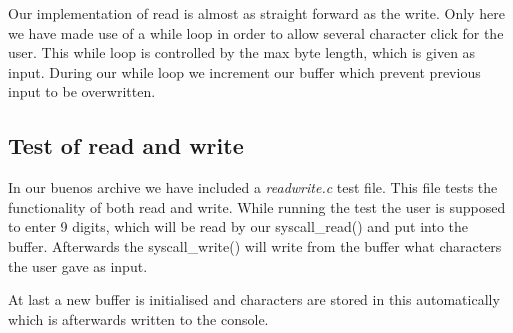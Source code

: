 \documentclass[12pt,a4paper,danish]{article}
\begin{document}
Our implementation of read is almost as straight forward as the write. Only here we have made use of a while loop in order to allow several character click for the user. This while loop is controlled by the max byte length, which is given as input.
During our while loop we increment our buffer which prevent previous input to be overwritten.

\subsection{Test of read and write}
In our buenos archive we have included a \textit{readwrite.c} test file. This file tests the functionality of both read and write.  While running the test the user is supposed to enter 9 digits, which will be read by our syscall\_read() and put into the buffer. Afterwards the syscall\_write() will write from the buffer what characters the user gave as input.

At last a new buffer is initialised and characters are stored in this automatically which is afterwards written to the console.
\end{document}
